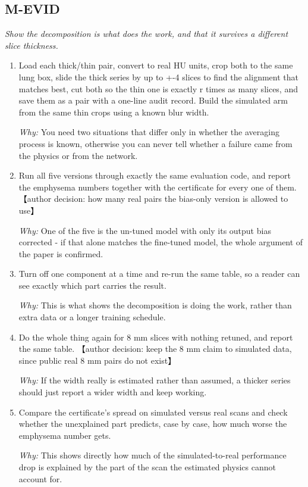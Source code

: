 \documentclass[10pt,a4paper]{article}
\begin{document}
\subsection*{M-EVID}
\emph{Show the decomposition is what does the work, and that it survives a different slice thickness.}
\begin{enumerate}[leftmargin=*,start=8]
  \item Load each thick/thin pair, convert to real HU units, crop both to the same lung box, slide the thick series by up to +-4 slices to find the alignment that matches best, cut both so the thin one is exactly r times as many slices, and save them as a pair with a one-line audit record. Build the simulated arm from the same thin crops using a known blur width.
\par\emph{Why:} You need two situations that differ only in whether the averaging process is known, otherwise you can never tell whether a failure came from the physics or from the network.
  \item Run all five versions through exactly the same evaluation code, and report the emphysema numbers together with the certificate for every one of them. 【author decision: how many real pairs the bias-only version is allowed to use】
\par\emph{Why:} One of the five is the un-tuned model with only its output bias corrected - if that alone matches the fine-tuned model, the whole argument of the paper is confirmed.
  \item Turn off one component at a time and re-run the same table, so a reader can see exactly which part carries the result.
\par\emph{Why:} This is what shows the decomposition is doing the work, rather than extra data or a longer training schedule.
  \item Do the whole thing again for 8 mm slices with nothing retuned, and report the same table. 【author decision: keep the 8 mm claim to simulated data, since public real 8 mm pairs do not exist】
\par\emph{Why:} If the width really is estimated rather than assumed, a thicker series should just report a wider width and keep working.
  \item Compare the certificate's spread on simulated versus real scans and check whether the unexplained part predicts, case by case, how much worse the emphysema number gets.
\par\emph{Why:} This shows directly how much of the simulated-to-real performance drop is explained by the part of the scan the estimated physics cannot account for.
\end{enumerate}
\end{document}
